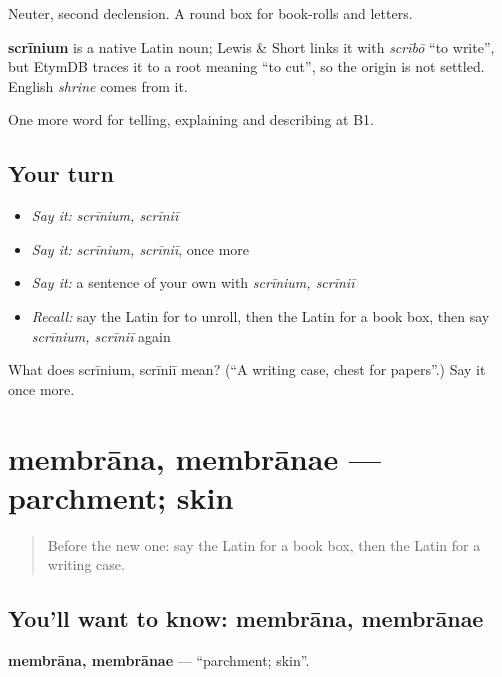 Neuter, second declension. A round box for book-rolls and letters.

\begin{cousinweb}
\textbf{scrīnium} is a native Latin noun; Lewis \& Short links it with \emph{scrībō} \textquotedblleft{}to write\textquotedblright{}, but EtymDB traces it to a root meaning \textquotedblleft{}to cut\textquotedblright{}, so the origin is not settled. English \emph{shrine} comes from it.
\end{cousinweb}

\begin{grammarlens}[title={What you've built}]
One more word for telling, explaining and describing at B1.
\end{grammarlens}

\subsection*{Your turn}
\begin{itemize}
\raggedright
  \item \emph{Say it:} \emph{scrīnium, scrīniī}
  \item \emph{Say it:} \emph{scrīnium, scrīniī}, once more
  \item \emph{Say it:} a sentence of your own with \emph{scrīnium, scrīniī}
  \item \emph{Recall:} say the Latin for to unroll, then the Latin for a book box, then say \emph{scrīnium, scrīniī} again
\end{itemize}

\begin{tcolorbox}[breakable,colback=teal!4,colframe=teal!35!black,title={Before you move on}]
What does scrīnium, scrīniī mean? (\textquotedblleft{}A writing case, chest for papers\textquotedblright{}.) Say it once more.
\end{tcolorbox}
\section[membrāna, membrānae]{membrāna, membrānae — parchment; skin}

\label{lesson:LA-C551-membrana}



\begin{quote}
Before the new one: say the Latin for a book box, then the Latin for a writing case.
\end{quote}

\subsection*{You'll want to know: membrāna, membrānae}
\textbf{membrāna, membrānae} — \textquotedblleft{}parchment; skin\textquotedblright{}.

